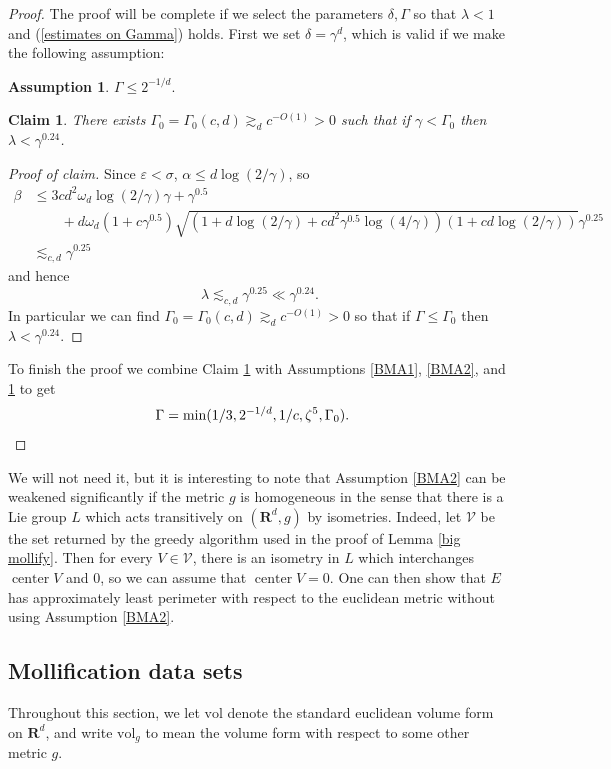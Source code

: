 \documentclass[reqno,12pt,letterpaper]{amsart}
\newcommand{\RR}{\mathbf{R}}
\DeclareMathOperator{\cent}{center}
\newcommand{\vol}{\mathrm{vol}}
\newtheorem{claim}[theorem]{Claim}
\theoremstyle{definition}
\newtheorem{assumption}[theorem]{Assumption}
\numberwithin{equation}{section}
\begin{document}
\begin{proof}
The proof will be complete if we select the parameters $\delta,\Gamma$ so that $\lambda < 1$ and (\ref{estimates on Gamma}) holds.
First we set $\delta = \gamma^d$, which is valid if we make the following assumption:
\begin{assumption}\label{BMA3}
$\Gamma \leq 2^{-1/d}$.
\end{assumption}

\begin{claim}\label{BMC3}
There exists $\Gamma_0 = \Gamma_0(c, d) \gtrsim_d c^{-O(1)} > 0$ such that if $\gamma < \Gamma_0$ then $\lambda < \gamma^{0.24}$.
\end{claim}
\begin{proof}[Proof of claim]
Since $\varepsilon < \sigma$, $\alpha \leq d\log(2/\gamma)$, so
\begin{align*}
\beta &\leq 3cd^2\omega_d\log(2/\gamma)\gamma +  \gamma^{0.5}\\
&\qquad+ d\omega_d(1 + c\gamma^{0.5})\sqrt{(1 + d\log(2/\gamma) + cd^2\gamma^{0.5}\log(4/\gamma))(1 + cd\log(2/\gamma))}\gamma^{0.25}\\
&\lesssim_{c, d} \gamma^{0.25}
\end{align*}
and hence
$$\lambda \lesssim_{c, d} \gamma^{0.25} \ll \gamma^{0.24}.$$
In particular we can find $\Gamma_0 = \Gamma_0(c, d) \gtrsim_d c^{-O(1)} > 0$ so that if $\Gamma \leq \Gamma_0$ then $\lambda < \gamma^{0.24}$.
\end{proof}

To finish the proof we combine Claim \ref{BMC3} with Assumptions \ref{BMA1}, \ref{BMA2}, and \ref{BMA3} to get
\begin{align*}\Gamma &= \min(1/3, 2^{-1/d}, 1/c, \zeta^5, \Gamma_0). \qedhere
\end{align*}
\end{proof}

We will not need it, but it is interesting to note that Assumption \ref{BMA2} can be weakened significantly if the metric $g$ is homogeneous in the sense that there is a Lie group $L$ which acts transitively on $(\RR^d, g)$ by isometries.
Indeed, let $\mathcal V$ be the set returned by the greedy algorithm used in the proof of Lemma \ref{big mollify}.
Then for every $V \in \mathcal V$, there is an isometry in $L$ which interchanges $\cent V$ and $0$, so we can assume that $\cent V = 0$.
One can then show that $E$ has approximately least perimeter with respect to the euclidean metric without using Assumption \ref{BMA2}.

\subsection{Mollification data sets}
Throughout this section, we let $\vol$ denote the standard euclidean volume form on $\RR^d$, and write $\vol_g$ to mean the volume form with respect to some other metric $g$.
\end{document}
